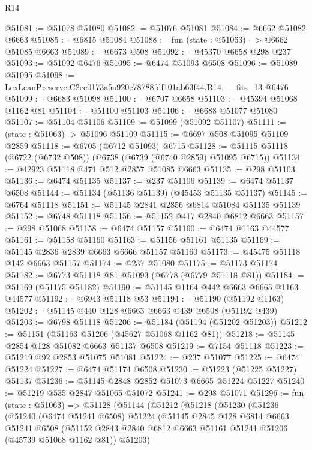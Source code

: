 \begin{lexlean}{R14}
\begin{coremodule}
@51081 := @51078 @51080
@51082 := @51076 @51081
@51084 := @6662 @51082 @6663
@51085 := @6815 @51084
@51088 := fun (state : @51063) => @6662 @51085 @6663
@51089 := @6673 @508
@51092 := @45370 @6658 @298 @237
@51093 := @51092 @6476
@51095 := @6474 @51093 @6508
@51096 := @51089 @51095
@51098 := LexLeanPreserve.C2ee0173a5a920c78788fdf101ab63f44.R14.__fits_13 @6476
@51099 := @6683 @51098
@51100 := @6707 @6658
@51103 := @45394 @51068 @1162 @81
@51104 := @51100 @51103
@51106 := @6688 @51077 @51080
@51107 := @51104 @51106
@51109 := @51099 (@51092 @51107)
@51111 := (state : @51063) -> @51096 @51109
@51115 := @6697 @508 @51095 @51109 @2859
@51118 := @6705 (@6712 @51093) @6715
@51128 := @51115 @51118 (@6722 (@6732 @508)) (@6738 (@6739 (@6740 @2859) @51095 @6715))
@51134 := @42923 @51118 @471 @512 @2857 @51085 @6663
@51135 := @298 @51103
@51136 := @6474 @51135
@51137 := @237 @51106
@51139 := @6474 @51137 @6508
@51144 := @51134 (@51136 @51139) (@45453 @51135 @51137)
@51145 := @6764 @51118
@51151 := @51145 @2841 @2856 @6814 @51084 @51135 @51139
@51152 := @6748 @51118
@51156 := @51152 @417 @2840 @6812 @6663
@51157 := @298 @51068
@51158 := @6474 @51157
@51160 := @6474 @1163 @44577
@51161 := @51158 @51160
@51163 := @51156 @51161 @51135
@51169 := @51145 @2836 @2839 @6663 @6666 @51157 @51160
@51173 := @45475 @51118 @142 @6663 @51157
@51174 := @237 @51080
@51175 := @51173 @51174
@51182 := @6773 @51118 @81 @51093 (@6778 (@6779 @51118 @81))
@51184 := @51169 (@51175 @51182)
@51190 := @51145 @1164 @442 @6663 @6665 @1163 @44577
@51192 := @6943 @51118 @53
@51194 := @51190 (@51192 @1163)
@51202 := @51145 @440 @128 @6663 @6663 @439 @6508 (@51192 @439)
@51203 := @6798 @51118
@51206 := @51184 (@51194 (@51202 @51203))
@51212 := @51151 (@51163 @51206 (@45627 @51068 @1162 @81))
@51218 := @51145 @2854 @128 @51082 @6663 @51137 @6508
@51219 := @7154 @51118
@51223 := @51219 @92 @2853 @51075 @51081
@51224 := @237 @51077
@51225 := @6474 @51224
@51227 := @6474 @51174 @6508
@51230 := @51223 (@51225 @51227) @51137
@51236 := @51145 @2848 @2852 @51073 @6665 @51224 @51227
@51240 := @51219 @535 @2847 @51065 @51072
@51241 := @298 @51071
@51296 := fun (state : @51063) =>
  @51128
    (@51144
      (@51212
        (@51218
          (@51230
            (@51236
              (@51240
                (@6474 @51241 @6508)
                @51224
                (@51145
                  @2845
                  @128
                  @6814
                  @6663
                  @51241
                  @6508
                  (@51152 @2843 @2840 @6812 @6663 @51161 @51241 @51206 (@45739 @51068 @1162 @81))
                  @51203)

\end{coremodule}
\end{lexlean}

